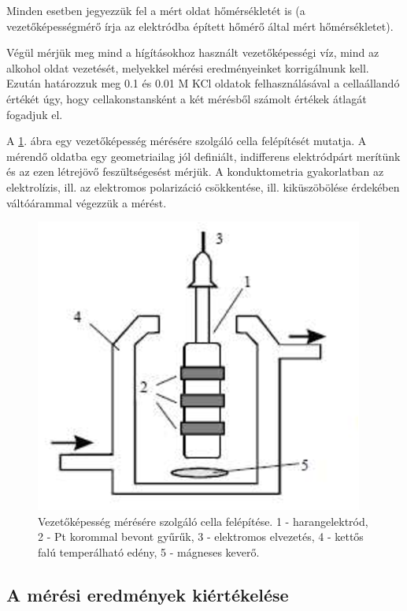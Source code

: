 Minden esetben jegyezzük fel a mért oldat hőmérsékletét is (a vezetőképességmérő írja az elektródba épített hőmérő által mért hőmérsékletet).

Végül mérjük meg mind a hígításokhoz használt vezetőképességi víz, mind az alkohol oldat vezetését, melyekkel mérési eredményeinket korrigálnunk kell.
Ezután határozzuk meg 0.1 és 0.01 M KCl oldatok felhasználásával a cellaállandó értékét úgy, hogy cellakonstansként a két mérésből számolt értékek átlagát fogadjuk el.

A \ref{fig:vez}. ábra egy vezetőképesség mérésére szolgáló cella felépítését mutatja.
A mérendő oldatba egy geometriailag jól definiált, indifferens elektródpárt merítünk és az ezen létrejövő feszültségesést mérjük.
A konduktometria gyakorlatban az elektrolízis, ill. az elektromos polarizáció csökkentése, ill. kiküszöbölése érdekében váltóárammal végezzük a mérést.

\begin{figure}
\centering
\includegraphics{fig/cond.eps}
\caption{Vezetőképesség mérésére szolgáló cella felépítése. 1 - harangelektród, 2 - Pt korommal bevont gyűrűk, 3 - elektromos elvezetés, 4 - kettős falú temperálható edény, 5 - mágneses keverő.}
\label{fig:vez}
\end{figure}



\subsection{A mérési eredmények kiértékelése}

